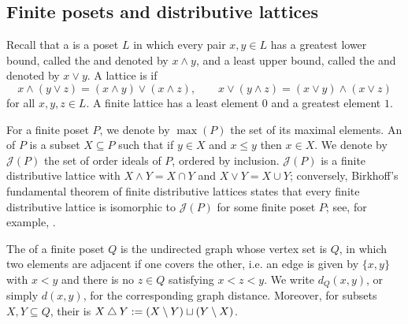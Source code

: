 \documentclass[a4paper,leqno]{amsart}
\begin{document}
\subsection{Finite posets and distributive lattices}

Recall that a  is a poset $L$ in which every pair $x,y\in L$ has a greatest lower bound, called the  and denoted by $x\wedge y$, and a least upper bound, called the  and denoted by $x\vee y$. A lattice is  if
\[
x\wedge(y\vee z)
 =(x\wedge y)\vee(x\wedge z),
\qquad
x\vee(y\wedge z)
 =(x\vee y)\wedge(x\vee z)
\]
for all $x,y,z\in L$. A finite lattice has a least element $0$ and a greatest element $1$.

For a finite poset $P$, we denote by $\max(P)$ the set of its maximal elements. An  of $P$ is a subset $X\subseteq P$ such that if $y\in X$ and $x\leq y$ then $x\in X$. We denote by $\mathcal J(P)$ the set of order ideals of $P$, ordered by inclusion. 
$\mathcal J(P)$ is a finite distributive lattice with $X\wedge Y=X\cap Y$ and $X\vee Y=X\cup Y$; conversely, Birkhoff's fundamental theorem of finite distributive lattices states that every finite distributive lattice is isomorphic to $\mathcal J(P)$ for some finite poset $P$; see, for example, \cite{Gra03}.

The  of a finite poset $Q$ is the undirected graph whose vertex set is $Q$, in which two elements are adjacent if one covers the other, i.e. an edge is given by $\{x,y\}$ with $x<y$ and there is no $z\in Q$ satisfying $x<z<y$. We write $d_Q(x,y)$, or simply $d(x,y)$, for the corresponding graph distance. Moreover, for subsets $X,Y\subseteq Q$, their  is $X\mathbin{\triangle} Y:=(X\setminus Y)\sqcup(Y\setminus X)$.
\end{document}
